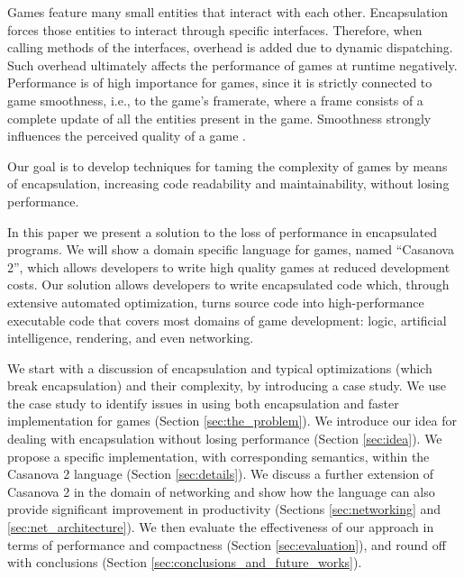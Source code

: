 Games feature many small entities that interact with each other. Encapsulation forces those entities to interact through specific interfaces. Therefore, when calling methods of the interfaces, overhead is added due to dynamic dispatching. Such overhead ultimately affects the performance of games at runtime negatively. Performance is of high importance for games, since it is strictly connected to game smoothness, i.e., to the game's framerate, where a frame consists of a complete update of all the entities present in the game. Smoothness strongly influences the perceived quality of a game \cite{claypool2009perspectives}.

Our goal is to develop techniques for taming the complexity of games by means of encapsulation, increasing code readability and maintainability, without losing performance.

In this paper we present a solution to the loss of performance in encapsulated programs. We will show a domain specific language for games, named ``Casanova 2'', which allows developers to write high quality games at reduced development costs. Our solution allows developers to write encapsulated code which, through extensive automated optimization, turns source code into high-performance executable code that covers most domains of game development: logic, artificial intelligence, rendering, and even networking.



We start with a discussion of encapsulation and typical optimizations (which break encapsulation) and their complexity, by introducing a case study. We use the case study to identify issues in using both encapsulation and faster implementation for games (Section \ref{sec:the_problem}). We introduce our idea for dealing with encapsulation without losing performance (Section \ref{sec:idea}). We propose a specific implementation, with corresponding semantics, within the Casanova 2 language (Section \ref{sec:details}). We discuss a further extension of Casanova 2 in the domain of networking and show how the language can also provide significant improvement in productivity (Sections \ref{sec:networking} and \ref{sec:net_architecture}). We then evaluate the effectiveness of our approach in terms of performance and compactness (Section \ref{sec:evaluation}), and round off with conclusions (Section \ref{sec:conclusions_and_future_works}). 